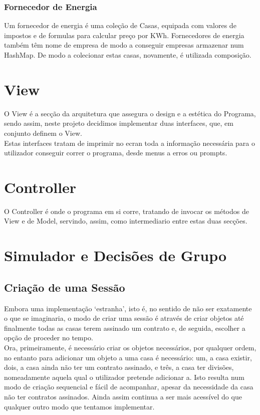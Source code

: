 \documentclass[10pt, a4paper]{article}
\begin{document}
\subsubsection{Fornecedor de Energia}
        Um fornecedor de energia é uma coleção de Casas, equipada com valores de impostos e de formulas para calcular preço por KWh.\@ 
        Fornecedores de energia também têm nome de empresa de modo a conseguir empresas armazenar num HashMap.
        De modo a colecionar estas casas, novamente, é utilizada composição.
\section{View}
        O View é a secção da arquitetura que assegura o design e a estética do Programa, sendo assim, neste projeto decidimos implementar duas interfaces, que,
        em conjunto definem o View. \\
        Estas interfaces tratam de imprimir no ecran toda a informação necessária para o utilizador conseguir correr o programa, desde menus a erros ou prompts.
\section{Controller}
        O Controller é onde o programa em si corre, tratando de invocar os métodos de View e de Model, servindo, assim, como intermediario entre estas duas secções.
\section{Simulador e Decisões de Grupo}
\subsection{Criação de uma Sessão}
        Embora uma implementação `estranha', isto é, no sentido de não ser exatamente o que se imaginaria, o modo de criar uma sessão é
        através de criar objetos até finalmente todas as casas terem assinado um contrato e, de seguida, escolher a opção de proceder no tempo. \\
        Ora, primeiramente, é necessário criar os objetos necessários, por qualquer ordem, no entanto para adicionar um objeto a uma casa é necessário: um,
        a casa existir, dois, a casa ainda não ter um contrato assinado, e três, a casa ter divisões, nomeadamente aquela qual o utilizador pretende adicionar a.\@
        Isto resulta num modo de criação sequencial e fácil de acompanhar, apesar da necessidade da casa não ter contratos assinados. \@ Ainda assim continua a ser mais acessível
        do que qualquer outro modo que tentamos implementar.
\end{document}
